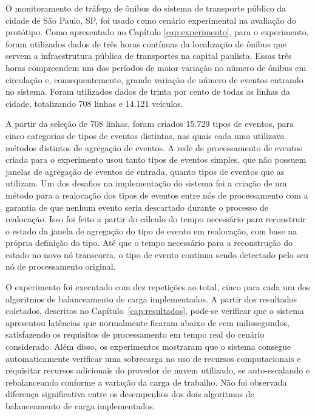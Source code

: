 O monitoramento de tráfego de ônibus do sistema de transporte
público da cidade de São Paulo, SP, foi usado como cenário experimental na avaliação do protótipo. Como apresentado no Capítulo \ref{cap:experimento}, para o experimento, foram utilizados dados de três horas contínuas da localização de ônibus que servem a infraestrutura pública de transportes na capital paulista. Essas três horas compreendem um dos períodos de maior variação no número de ônibus em circulação e, consequentemente, grande variação de número de eventos entrando no sistema. Foram utilizados dados de trinta por cento de todas as linhas da cidade, totalizando 708 linhas e 14.121 veículos. %

A partir da seleção de 708 linhas, foram criados 15.729 tipos de eventos, para cinco categorias de tipos de eventos distintas, nas quais cada uma utilizava métodos distintos de agregação de eventos. A rede de processamento de eventos criada para o experimento usou tanto tipos de eventos simples, que não possuem janelas de agregação de eventos de entrada, quanto tipos de eventos que as utilizam. Um dos desafios na implementação do sistema foi a criação de um método para a realocação dos tipos de eventos entre nós de processamento com a garantia de que nenhum evento seria descartado durante o processo de realocação. Isso foi feito a partir do cálculo do tempo necessário para reconstruir o estado da janela de agregação do tipo de evento em realocação, com base na própria definição do tipo. Até que o tempo necessário para a reconstrução do estado no novo nó transcorra, o tipo de evento continua sendo detectado pelo seu nó de processamento original.

O experimento foi executado com dez repetições ao total, cinco para cada um dos algoritmos de balanceamento de carga implementados. A partir dos resultados coletados, descritos no Capítulo~\ref{cap:resultados}, pode-se verificar que o sistema apresentou latências que normalmente ficaram abaixo de cem milissegundos,  satisfazendo os requisitos de processamento em tempo real do cenário considerado. Além disso, os experimentos mostraram que o sistema consegue automaticamente verificar uma sobrecarga no uso de recursos computacionais e requisitar recursos adicionais do provedor de nuvem utilizado, se auto-escalando e rebalanceando conforme a variação da carga de trabalho. Não foi observada diferença significativa entre os desempenhos dos dois algoritmos de balanceamento de carga implementados.


